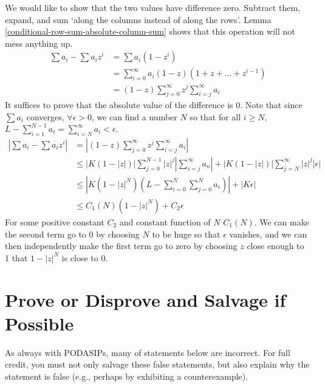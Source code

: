 \documentclass{homework}
\begin{document}
\begin{solution}
We would like to show that the two values have difference zero. Subtract them, expand, and sum `along the columns instead of along the rows'. Lemma \ref{conditional-row-sum-absolute-column-sum} shows that this operation will not mess anything up.
\begin{align*}
\sum a_i - \sum a_iz^i &= \sum a_i(1-z^i)\\
&= \sum_{i=0}^\infty a_i(1-z)(1 + z + \dots + z^{i-1})\\
&= (1 - z)\sum_{j=0}^\infty z^j\sum_{i=j}^\infty a_i
\end{align*}
It suffices to prove that the absolute value of the difference is 0. Note that since $\sum a_i$ converges, $\forall \epsilon > 0$, we can find a number $N$ so that for all $i\geq N$, $L-\sum_{i=1}^{N-1} a_i = \sum_{i=N}^\infty a_i < \epsilon.$
\begin{align*}
|\sum a_i - \sum a_iz^i| &=  \left|(1 - z)\sum_{j=0}^\infty z^j\sum_{i=j}^\infty a_i\right|\\
&\leq \left|K(1 - |z|)\right|\sum_{j=0}^{N-1} |z|^j\left|\sum_{i=j}^\infty a_n\right| + \left|K(1 - |z|)\right|\sum_{j=N}^\infty |z|^j|\epsilon|\\
&\leq \left|K(1 - |z|^{N})(L-\sum_{i=0}^N\sum_{j=0}^N a_i)\right| +
|K\epsilon|\\
&\leq C_1(N)(1 - |z|^{N}) + C_2\epsilon
\end{align*}
For some positive constant $C_2$ and constant function of $N$ $C_1(N)$. We can make the second term go to 0 by choosing $N$ to be huge so that $\epsilon$ vanishes, and we can then independently make the first term go to zero by choosing $z$ close enough to 1 that $1-|z|^N$ is close to 0.
\end{solution}
\section{Prove or Disprove and Salvage if Possible}
As always with PODASIPs, many of statements below are incorrect.  For
full credit, you must not only salvage these false statements, but
also explain why the statement is false (e.g., perhaps by exhibiting a
counterexample).
\end{document}

